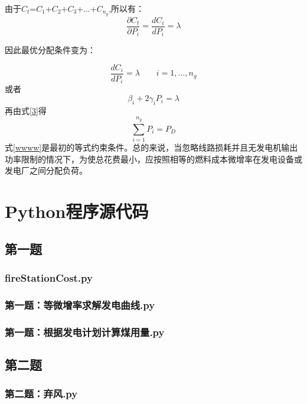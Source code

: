 \documentclass{cumcmthesis}
\begin{document}
\begin{appendices}
	由于$C_{t} $=$C_{1} $+$C_{2} $+$C_{3} $+...+$C_{n_{g}} $,所以有：
	\begin{equation}
		\frac{\partial C_{t}}{\partial P_{i}}=\frac{dC_{i}}{dP_{i}}=\lambda
	\end{equation}
	
	因此最优分配条件变为：
	
	\begin{equation}
		\frac{d C_{i}}{d P_{i}}=\lambda\qquad i=1,...,n_{g}
	\end{equation}
	或者
	\begin{equation}
		\beta_{i}+2\gamma_{i}P_{i}=\lambda
	\end{equation}
	再由式\ref{3}得
	\begin{equation}\label{wwww}
		\sum_{i=1}^{n_{g}}P_{i}=P_{D}
	\end{equation}
	式\ref{wwww}是最初的等式约束条件。总的来说，当忽略线路损耗并且无发电机输出功率限制的情况下，为使总花费最小，应按照相等的燃料成本微增率在发电设备或发电厂之间分配负荷。
	
	\section{Python程序源代码}
	
	\subsection{第一题}
	
	\subsubsection{fireStationCost.py}
	
	\subsubsection{第一题：等微增率求解发电曲线.py}\label{等微增率求解发电曲线}
		
	\subsubsection{第一题：根据发电计划计算煤用量.py}
	
	\subsection{第二题}
	\subsubsection{第二题：弃风.py}
		

\end{appendices}
\end{document}
